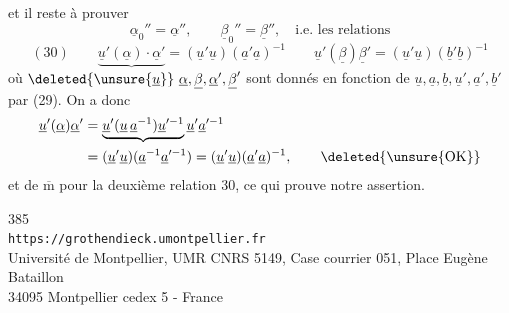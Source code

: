 et il reste à prouver
\[
\underline\alpha_0''=\underline\alpha'',\qquad
\underline\beta_0''=\underline\beta'',\quad\text{i.e. les relations}
\]
\[
(30)\qquad
\underbrace{\underline u'(\underline\alpha)\cdot\underline\alpha'}
 =(\underline u'\underline u)(\underline a'\underline a)^{-1}
\qquad
\underline u'(\underline\beta)\underline\beta'
 =(\underline u'\underline u)(\underline b'\underline b)^{-1}
\]
où $\deleted{\unsure{\underline u}}\ \underline\alpha,\underline\beta,\underline\alpha',\underline\beta'$ sont donnés en fonction de  $\underline u,\underline a,\underline b,\underline u',\underline a',\underline b'$ par (29). On a donc
\[
\begin{aligned}
\underline u'(\underline\alpha)\underline\alpha'
 &=\underbrace{\underline u'(\underline u\,\underline a^{-1})\underline u'^{-1}}\underline u'\underline a'^{-1}\\
 &=(\underline u'\underline u)(\underline a^{-1}\underline a'^{-1})
 =(\underline u'\underline u)(\underline a'\underline a)^{-1},
 \qquad\deleted{\text{\unsure{OK}}}
\end{aligned}
\]
 et de $\overline{\mathrm m}$ pour la deuxième relation 30, ce qui prouve notre assertion.
\margin{$\unsure{\checkmark|/}$}

\begin{center}
385\\
\texttt{https://grothendieck.umontpellier.fr}\\
Université de Montpellier, UMR CNRS 5149, Case courrier 051, Place Eugène Bataillon\\
34095 Montpellier cedex 5 - France
\end{center}

